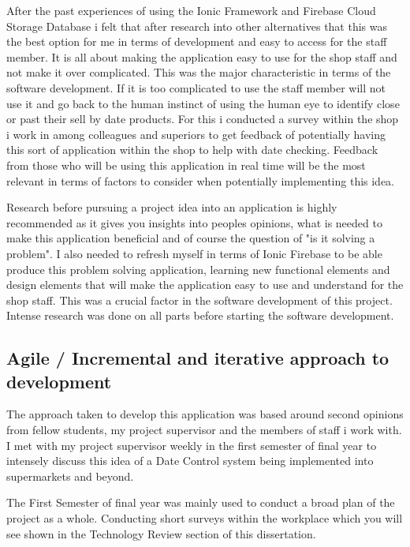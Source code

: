 After the past experiences of using the Ionic Framework and Firebase Cloud Storage Database i felt that after research into other alternatives that this was the best option for me in terms of development and easy to access for the staff member. It is all about making the application easy to use for the shop staff and not make it over complicated. This was the major characteristic in terms of the software development. If it is too complicated to use the staff member will not use it and go back to the human instinct of using the human eye to identify close or past their sell by date products. For this i conducted a survey within the shop i work in among colleagues and superiors to get feedback of potentially having this sort of application within the shop to help with date checking. Feedback from those who will be using this application in real time will be the most relevant in terms of factors to consider when potentially implementing this idea. 
\newline

Research before pursuing a project idea into an application is highly recommended as it gives you insights into peoples opinions, what is needed to make this application beneficial and of course the question of "is it solving a problem". I also needed to refresh myself in terms of Ionic Firebase to be able produce this problem solving application, learning new functional elements and design elements that will make the application easy to use and understand for the shop staff. This was a crucial factor in the software development of this project. Intense research was done on all parts before starting the software development.



\subsection{Agile / Incremental and iterative approach to development}
The approach taken to develop this application was based around second opinions from fellow students, my project supervisor and the members of staff i work with. I met with my project supervisor weekly in the first semester of final year to intensely discuss this idea of a Date Control system being implemented into supermarkets and beyond. \newline

The First Semester of final year was mainly used to conduct a broad plan of the project as a whole. Conducting short surveys within the workplace which you will see shown in the Technology Review section of this dissertation. 
\newline

